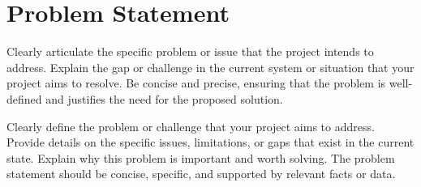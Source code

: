 \section{Problem Statement}
Clearly articulate the specific problem or issue that the project intends to address. Explain the gap or challenge in the current system or situation that your project aims to resolve. Be concise and precise, ensuring that the problem is well-defined and justifies the need for the proposed solution.

Clearly define the problem or challenge that your project aims to address. Provide details on the specific issues, limitations, or gaps that exist in the current state. Explain why this problem is important and worth solving. The problem statement should be concise, specific, and supported by relevant facts or data.